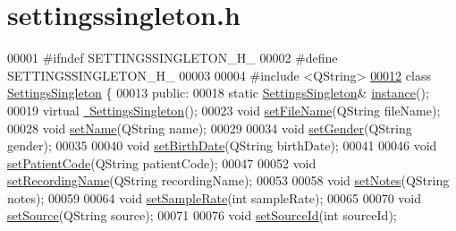 \hypertarget{settingssingleton_8h_source}{}\section{settingssingleton.\+h}
\label{settingssingleton_8h_source}

\begin{DoxyCode}
00001 \textcolor{preprocessor}{#ifndef SETTINGSSINGLETON\_H\_}
00002 \textcolor{preprocessor}{#define SETTINGSSINGLETON\_H\_}
00003 
00004 \textcolor{preprocessor}{#include <QString>}
\hypertarget{settingssingleton_8h_source.tex_l00012}{}\hyperlink{classSettingsSingleton}{00012} \textcolor{keyword}{class }\hyperlink{classSettingsSingleton}{SettingsSingleton} \{
00013 \textcolor{keyword}{public}:
00018     \textcolor{keyword}{static} \hyperlink{classSettingsSingleton}{SettingsSingleton}& \hyperlink{classSettingsSingleton_aad528becd7ce5903c418a5b8b718074c}{instance}();
00019     \textcolor{keyword}{virtual} \hyperlink{classSettingsSingleton_a91b78db84657cbeb299c30e4aac3c269}{~SettingsSingleton}();
00023     \textcolor{keywordtype}{void} \hyperlink{classSettingsSingleton_aec045fc249983ef4ac0de4ba8925b300}{setFileName}(QString fileName);
00028     \textcolor{keywordtype}{void} \hyperlink{classSettingsSingleton_a383c335986ea26502cb65886a9fea1ac}{setName}(QString name);
00029 
00034     \textcolor{keywordtype}{void} \hyperlink{classSettingsSingleton_a00746454430a23dc51fd64834e35bf0f}{setGender}(QString gender);
00035 
00040     \textcolor{keywordtype}{void} \hyperlink{classSettingsSingleton_a1b23c39146607ea723fc97f570e6e3e1}{setBirthDate}(QString birthDate);
00041 
00046     \textcolor{keywordtype}{void} \hyperlink{classSettingsSingleton_a43d597e9d39a9b76a11c4575d8d71adc}{setPatientCode}(QString patientCode);
00047 
00052     \textcolor{keywordtype}{void} \hyperlink{classSettingsSingleton_a015183461cfd8c90a1419341e09c7c92}{setRecordingName}(QString recordingName);
00053 
00058     \textcolor{keywordtype}{void} \hyperlink{classSettingsSingleton_ac9c888265f360f1fe7ee3fb9441dd514}{setNotes}(QString notes);
00059 
00064     \textcolor{keywordtype}{void} \hyperlink{classSettingsSingleton_afb6c1555d8a9a93fab574345b7e28e28}{setSampleRate}(\textcolor{keywordtype}{int} sampleRate);
00065 
00070     \textcolor{keywordtype}{void} \hyperlink{classSettingsSingleton_af3d750e4f32db65df430d03a9b947b16}{setSource}(QString source);
00071 
00076     \textcolor{keywordtype}{void} \hyperlink{classSettingsSingleton_af4b9b4364b4146711000f425dd5f5aa9}{setSourceId}(\textcolor{keywordtype}{int} sourceId);

\end{DoxyCode}
